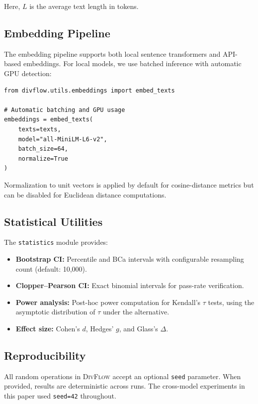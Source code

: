 \documentclass[11pt,a4paper]{article}
\newcommand{\divflow}{\textsc{DivFlow}}
\begin{document}
Here, $L$ is the average text length in tokens.

\subsection{Embedding Pipeline}

The embedding pipeline supports both local sentence
transformers and API-based embeddings.  For local
models, we use batched inference with automatic
GPU detection:

\begin{verbatim}
from divflow.utils.embeddings import embed_texts

# Automatic batching and GPU usage
embeddings = embed_texts(
    texts=texts,
    model="all-MiniLM-L6-v2",
    batch_size=64,
    normalize=True
)
\end{verbatim}

Normalization to unit vectors is applied by default for
cosine-distance metrics but can be disabled for Euclidean
distance computations.

\subsection{Statistical Utilities}

The \texttt{statistics} module provides:

\begin{itemize}[leftmargin=2em,itemsep=2pt]
\item \textbf{Bootstrap CI:} Percentile and BCa intervals
      with configurable resampling count (default: 10{,}000).
\item \textbf{Clopper--Pearson CI:} Exact binomial intervals
      for pass-rate verification.
\item \textbf{Power analysis:} Post-hoc power computation
      for Kendall's $\tau$ tests, using the asymptotic
      distribution of $\tau$ under the alternative.
\item \textbf{Effect size:} Cohen's $d$, Hedges' $g$, and
      Glass's $\Delta$.
\end{itemize}

\subsection{Reproducibility}

All random operations in \divflow{} accept an optional
\texttt{seed} parameter.  When provided, results are
deterministic across runs.  The cross-model experiments
in this paper used \texttt{seed=42} throughout.
\end{document}
